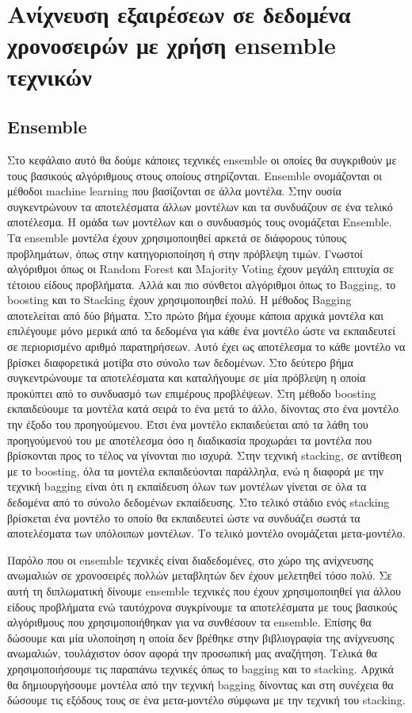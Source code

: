 \documentclass[a4paper,12pt]{report}
\theoremstyle{definitionNODot}
\begin{document}
	
	\chapter{Ανίχνευση εξαιρέσεων σε δεδομένα χρονοσειρών με χρήση ensemble τεχνικών}
	\section{Ensemble}
	Στο κεφάλαιο αυτό θα δούμε κάποιες τεχνικές ensemble οι οποίες θα συγκριθούν με τους βασικούς αλγόριθμους στους οποίους στηρίζονται. Ensemble ονομάζονται οι μέθοδοι machine learning που βασίζονται σε άλλα μοντέλα. Στην ουσία συγκεντρώνουν τα αποτελέσματα άλλων μοντέλων και τα συνδυάζουν σε ένα τελικό αποτέλεσμα. Η ομάδα των μοντέλων και ο συνδυασμός τους ονομάζεται Ensemble. Τα ensemble μοντέλα έχουν χρησιμοποιηθεί αρκετά σε διάφορους τύπους προβλημάτων, όπως στην κατηγοριοποίηση ή στην πρόβλεψη τιμών. Γνωστοί αλγόριθμοι όπως οι Random Forest και Majority Voting έχουν μεγάλη επιτυχία σε τέτοιου είδους προβλήματα. Αλλά και πιο σύνθετοι αλγόριθμοι όπως το Bagging, το boosting και το Stacking έχουν χρησιμοποιηθεί πολύ. Η μέθοδος Bagging αποτελείται από δύο βήματα. Στο πρώτο βήμα έχουμε κάποια αρχικά μοντέλα και επιλέγουμε μόνο μερικά από τα δεδομένα για κάθε ένα μοντέλο ώστε να εκπαιδευτεί σε περιορισμένο αριθμό παρατηρήσεων. Αυτό έχει ως αποτέλεσμα το κάθε μοντέλο να βρίσκει διαφορετικά μοτίβα στο σύνολο των δεδομένων. Στο δεύτερο βήμα συγκεντρώνουμε τα αποτελέσματα και καταλήγουμε σε μία πρόβλεψη η οποία προκύπτει από το συνδυασμό των επιμέρους προβλέψεων. Στη μέθοδο boosting εκπαιδεύουμε τα μοντέλα κατά σειρά το ένα μετά το άλλο, δίνοντας στο ένα μοντέλο την έξοδο του προηγούμενου. Έτσι ένα μοντέλο εκπαιδεύεται από τα λάθη του προηγούμενού του με αποτέλεσμα όσο η διαδικασία προχωράει τα μοντέλα που βρίσκονται προς το τέλος να γίνονται πιο ισχυρά. Στην τεχνική stacking, σε αντίθεση με το boosting, όλα τα μοντέλα εκπαιδεύονται παράλληλα, ενώ η διαφορά με την τεχνική bagging είναι ότι η εκπαίδευση όλων των μοντέλων γίνεται σε όλα τα δεδομένα από το σύνολο δεδομένων εκπαίδευσης. Στο τελικό στάδιο ενός stacking βρίσκεται ένα μοντέλο το οποίο θα εκπαιδευτεί ώστε να συνδυάζει σωστά τα αποτελέσματα των υπόλοιπων μοντέλων. Το τελικό μοντέλο ονομάζεται μετα-μοντέλο. 
	
	Παρόλο που οι ensemble τεχνικές είναι διαδεδομένες, στο χώρο της ανίχνευσης ανωμαλιών σε χρονοσειρές πολλών μεταβλητών δεν έχουν μελετηθεί τόσο πολύ. Σε αυτή τη διπλωματική δίνουμε ensemble τεχνικές που έχουν χρησιμοποιηθεί για άλλου είδους προβλήματα ενώ ταυτόχρονα συγκρίνουμε τα αποτελέσματα με τους βασικούς αλγόριθμους που χρησιμοποιήθηκαν για να συνθέσουν τα ensemble. Επίσης θα δώσουμε και μία υλοποίηση η οποία δεν βρέθηκε στην βιβλιογραφία της ανίχνευσης ανωμαλιών, τουλάχιστον όσον αφορά την προσωπική μας αναζήτηση. Τελικά θα χρησιμοποιήσουμε τις παραπάνω τεχνικές όπως το bagging και το stacking. Αρχικά θα δημιουργήσουμε μοντέλα από την τεχνική bagging δίνοντας και στη συνέχεια θα δώσουμε τις εξόδους τους σε ένα μετα-μοντέλο σύμφωνα με την τεχνική του stacking. 
	
\end{document}
